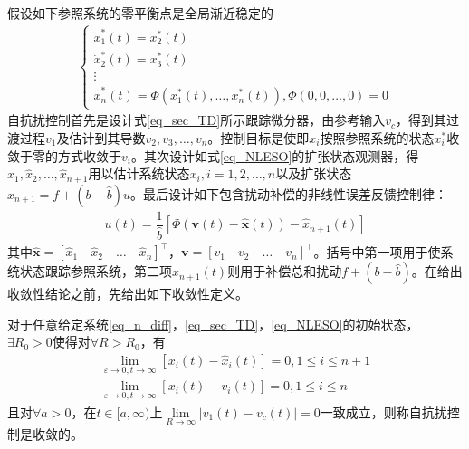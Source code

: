 假设如下参照系统的零平衡点是全局渐近稳定的
\begin{align}\left\{\begin{array}{l}
\dot{x}_{1}^{*}(t)=x_{2}^{*}(t) \\
\dot{x}_{2}^{*}(t)=x_{3}^{*}(t) \\
\vdots \\
\dot{x}_{n}^{*}(t)=\Phi\left(x_{1}^{*}(t), \ldots, x_{n}^{*}(t)\right), \Phi(0,0, \ldots, 0)=0
\end{array}\right.	\label{eq_ref_sys}
\end{align}
自抗扰控制首先是设计式\eqref{eq_sec_TD}所示跟踪微分器，由参考输入$ v_c $，得到其过渡过程$v_1$及估计到其导数$v_2,v_3,\ldots,v_n$。控制目标是使即$x_i$按照参照系统的状态$ x^*_i $收敛于零的方式收敛于$v_i$。其次设计如式\eqref{eq_NLESO}的扩张状态观测器，得$\hat{x}_1,\hat{x}_2,\ldots,\hat{x}_{n+1}$用以估计系统状态$x_i,i=1,2,\ldots,n$以及扩张状态$x_{n+1}=f+(b-\hat{b}) u$。最后设计如下包含扰动补偿的非线性误差反馈控制律：
\begin{align}
u(t)=\dfrac{1}{\hat{b}}\left[\Phi\left(\bm{v}(t)-\hat{\bm{x}}(t)\right)-\hat{x}_{n+1}(t)\right]	\label{eq_feefback}
\end{align}
其中$\hat{\bm{x}}=[\hat{x}_{1} \quad \hat{x}_{2} \quad \ldots \quad \hat{x}_{n}]^\top $，$ \bm{v}=[ v_1 \quad v_2 \quad \ldots \quad v_n]^\top  $。括号中第一项用于使系统状态跟踪参照系统，第二项$ \hat{x}_{n+1}(t) $则用于补偿总和扰动$ f+(b-\hat{b}) $。在给出收敛性结论之前，先给出如下收敛性定义。
\begin{definition}
对于任意给定系统\eqref{eq_n_diff}，\eqref{eq_sec_TD}，\eqref{eq_NLESO}的初始状态，$ \exists R_0 >0 $使得对$ \forall R>R_0 $，有
\begin{equation}
\begin{aligned}
\lim_{\varepsilon \rightarrow 0, t \rightarrow \infty}\left[x_{i}(t)-\hat{x}_{i}(t)\right]=0,1 \leq i \leq n+1 \\
\lim_{\varepsilon \rightarrow 0, t \rightarrow \infty}\left[x_{i}(t)-v_{i}(t)\right]=0,1 \leq i \leq n
\end{aligned}
\end{equation}
且对$ \forall a>0 $，在$t \in [a,\infty)$上$\lim\limits_{R \rightarrow \infty}\left|v_{1}(t)-v_c(t)\right|=0$一致成立，则称自抗扰控制是收敛的。
\end{definition}

